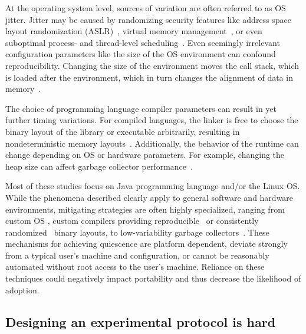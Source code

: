\documentclass[conference]{IEEEtran}
\begin{document}
At the operating system level, sources of variation are often referred to as
OS jitter.
Jitter may be caused by randomizing security features like address space layout
randomization (ASLR)~\cite{Shacham2004},
virtual memory management~\cite{Oyama2014,Oyama2016},
or even suboptimal process- and thread-level scheduling~\cite{Lozi2016}.
Even seemingly irrelevant configuration parameters like the size of the
OS environment can confound reproducibility. Changing the size of the
environment moves the call stack, which is loaded after the environment, which
in turn changes the alignment of data in memory~\cite{Mytkowicz2009}.

The choice of programming language compiler parameters can result in yet
further timing variations.
For compiled languages, the linker is free to choose the binary layout of the
library or executable arbitrarily, resulting in nondeterministic memory
layouts~\cite{Georges2008}.
Additionally, the behavior of the runtime can change depending on OS or hardware
parameters. For example, changing the heap size can affect garbage collector
performance~\cite{Blackburn2004}.

Most of these studies focus on Java programming language and/or the Linux OS.
While the phenomena described clearly apply to general software and hardware environments,
mitigating strategies are often highly specialized, ranging from custom OS
\cite{Akkan2012}, custom compilers providing
reproducible~\cite{Georges2008} or consistently randomized~\cite{Curtsinger2013}
binary layouts, to low-variability garbage collectors~\cite{Huang2004}.
These mechanisms for achieving quiescence are platform dependent, deviate strongly
from a typical user's machine and configuration, or cannot be reasonably automated without
root access to the user's machine. Reliance on these techniques could negatively impact
portability and thus decrease the likelihood of adoption.

\subsection{Designing an experimental protocol is hard}

\end{document}
